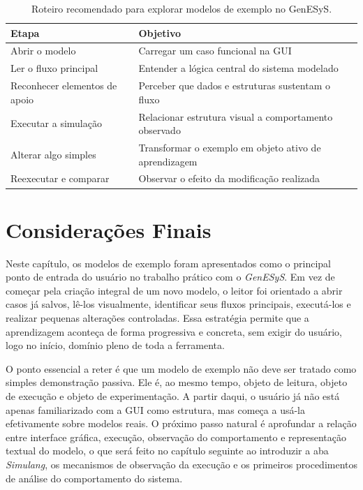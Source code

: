 \begin{table}[htbp]
    \centering
    \caption{Roteiro recomendado para explorar modelos de exemplo no GenESyS.}
    \label{tab:cap4_roteiro_modelos_exemplo}
    \small
    \begin{tabular}{|p{4.2cm}|p{7.1cm}|}
        \hline
        \textbf{Etapa} & \textbf{Objetivo} \\
        \hline
        Abrir o modelo & Carregar um caso funcional na GUI \\
        \hline
        Ler o fluxo principal & Entender a lógica central do sistema modelado \\
        \hline
        Reconhecer elementos de apoio & Perceber que dados e estruturas sustentam o fluxo \\
        \hline
        Executar a simulação & Relacionar estrutura visual a comportamento observado \\
        \hline
        Alterar algo simples & Transformar o exemplo em objeto ativo de aprendizagem \\
        \hline
        Reexecutar e comparar & Observar o efeito da modificação realizada \\
        \hline
    \end{tabular}
\end{table}

\section{Considerações Finais}
\label{sec:cap4_consideracoes_finais}

Neste capítulo, os modelos de exemplo foram apresentados como o principal ponto de entrada do usuário no trabalho prático com o \textit{GenESyS}. Em vez de começar pela criação integral de um novo modelo, o leitor foi orientado a abrir casos já salvos, lê-los visualmente, identificar seus fluxos principais, executá-los e realizar pequenas alterações controladas. Essa estratégia permite que a aprendizagem aconteça de forma progressiva e concreta, sem exigir do usuário, logo no início, domínio pleno de toda a ferramenta.

O ponto essencial a reter é que um modelo de exemplo não deve ser tratado como simples demonstração passiva. Ele é, ao mesmo tempo, objeto de leitura, objeto de execução e objeto de experimentação. A partir daqui, o usuário já não está apenas familiarizado com a GUI como estrutura, mas começa a usá-la efetivamente sobre modelos reais. O próximo passo natural é aprofundar a relação entre interface gráfica, execução, observação do comportamento e representação textual do modelo, o que será feito no capítulo seguinte ao introduzir a aba \textit{Simulang}, os mecanismos de observação da execução e os primeiros procedimentos de análise do comportamento do sistema.


